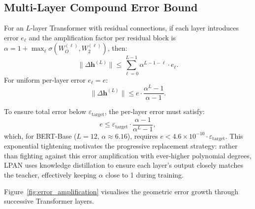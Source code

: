 \subsection{Multi-Layer Compound Error Bound}

\begin{theorem}
\label{thm:compound_error}
For an $L$-layer Transformer with residual connections, if each layer introduces error $e_\ell$ and the amplification factor per residual block is $\alpha = 1 + \max_\ell \sigma(W_O^{(\ell)}, W_2^{(\ell)})$, then:
\begin{equation}
    \|\Delta \mathbf{h}^{(L)}\| \leq \sum_{\ell=0}^{L-1} \alpha^{L-1-\ell} \cdot e_\ell.
    \label{eq:compound_error}
\end{equation}
For uniform per-layer error $e_\ell = e$:
\begin{equation}
    \|\Delta \mathbf{h}^{(L)}\| \leq e \cdot \frac{\alpha^L - 1}{\alpha - 1}.
    \label{eq:compound_uniform}
\end{equation}
\end{theorem}

\begin{corollary}
\label{cor:depth_requirement}
To ensure total error below $\varepsilon_{\text{target}}$, the per-layer error must satisfy:
\begin{equation}
    e \leq \varepsilon_{\text{target}} \cdot \frac{\alpha - 1}{\alpha^L - 1},
    \label{eq:depth_requirement}
\end{equation}
which, for BERT-Base ($L=12$, $\alpha \approx 6.16$), requires $e < 4.6 \times 10^{-10} \cdot \varepsilon_{\text{target}}$. This exponential tightening motivates the progressive replacement strategy: rather than fighting against this error amplification with ever-higher polynomial degrees, LPAN uses knowledge distillation to ensure each layer's output closely matches the teacher, effectively keeping $\alpha$ close to 1 during training.
\end{corollary}

Figure~\ref{fig:error_amplification} visualises the geometric error growth through successive Transformer layers.

